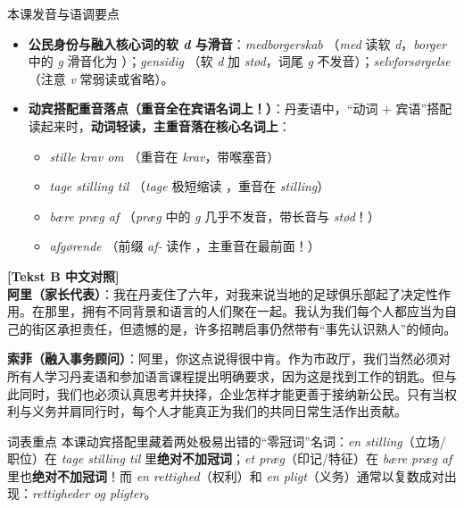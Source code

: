 \begin{tipbox}{本课发音与语调要点}
\begin{itemize}
  \item \textbf{公民身份与融入核心词的软 \textit{d} 与滑音}：\textit{medborgerskab} （\textit{med} 读软 \textit{d}，\textit{borger} 中的 \textit{g} 滑音化为 ）；\textit{gensidig} （软 \textit{d} 加 \textit{stød}，词尾 \textit{g} 不发音）；\textit{selvforsørgelse} （注意 \textit{v} 常弱读或省略）。
  \item \textbf{动宾搭配重音落点（重音全在宾语名词上！）}：丹麦语中，“动词 + 宾语”搭配读起来时，\textbf{动词轻读，主重音落在核心名词上}：
    \begin{itemize}
      \item \textit{stille krav om} （重音在 \textit{krav}，带喉塞音）
      \item \textit{tage stilling til} （\textit{tage} 极短缩读 ，重音在 \textit{stilling}）
      \item \textit{bære præg af} （\textit{præg} 中的 \textit{g} 几乎不发音，带长音与 \textit{stød}！）
      \item \textit{afgørende} （前缀 \textit{af-} 读作 ，主重音在最前面！）
    \end{itemize}
\end{itemize}
\end{tipbox}

\begin{transbox}
\small
\textbf{\color{NCDTeal}[Tekst B 中文对照]}\\
\textbf{阿里（家长代表）}：我在丹麦住了六年，对我来说当地的足球俱乐部起了决定性作用。在那里，拥有不同背景和语言的人们聚在一起。我认为我们每个人都应当为自己的街区承担责任，但遗憾的是，许多招聘启事仍然带有“事先认识熟人”的倾向。

\textbf{索菲（融入事务顾问）}：阿里，你这点说得很中肯。作为市政厅，我们当然必须对所有人学习丹麦语和参加语言课程提出明确要求，因为这是找到工作的钥匙。但与此同时，我们也必须认真思考并抉择，企业怎样才能更善于接纳新公民。只有当权利与义务并肩同行时，每个人才能真正为我们的共同日常生活作出贡献。
\end{transbox}


\begin{tipbox}{词表重点}
本课动宾搭配里藏着两处极易出错的“零冠词”名词：\textit{en stilling}（立场/职位）在 \textit{tage stilling til} 里\textbf{绝对不加冠词}；\textit{et præg}（印记/特征）在 \textit{bære præg af} 里也\textbf{绝对不加冠词}！而 \textit{en rettighed}（权利）和 \textit{en pligt}（义务）通常以复数成对出现：\textit{rettigheder og pligter}。
\end{tipbox}

